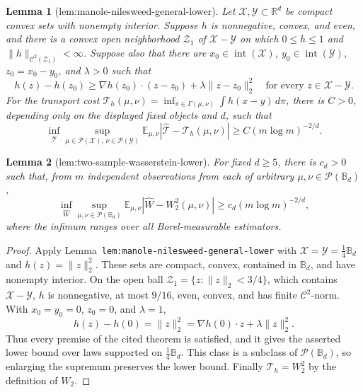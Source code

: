 \documentclass{article}
\newtheorem{lemma}{Lemma}
\begin{document}
\begin{lemma}[lem:manole-nilesweed-general-lower]\label{lem:manole-nilesweed-general-lower}
Let \(\mathcal X,\mathcal Y\subset\mathbb R^d\) be compact convex sets with nonempty interior. Suppose \(h\) is nonnegative, convex, and even, and there is a convex open neighborhood \(\mathcal Z_1\) of \(\mathcal X-\mathcal Y\) on which \(0\le h\le1\) and \(\|h\|_{\mathcal C^2(\mathcal Z_1)}<\infty\). Suppose also that there are \(x_0\in\operatorname{int}(\mathcal X)\), \(y_0\in\operatorname{int}(\mathcal Y)\), \(z_0=x_0-y_0\), and \(\lambda>0\) such that
\[
h(z)-h(z_0)\ge \nabla h(z_0)\mathbin\cdot(z-z_0)+\lambda\|z-z_0\|_2^2
\quad\text{for every }z\in\mathcal X-\mathcal Y.
\]
For the transport cost \(\mathcal T_h(\mu,\nu)=\inf_{\pi\in\Gamma(\mu,\nu)}\int h(x-y)\,d\pi\), there is \(C>0\), depending only on the displayed fixed objects and \(d\), such that
\[
\inf_{\widehat{\mathcal T}}\sup_{\mu\in\mathcal P(\mathcal X),\,\nu\in\mathcal P(\mathcal Y)}
\mathbb E_{\mu,\nu}|\widehat{\mathcal T}-\mathcal T_h(\mu,\nu)|
\ge C(m\log m)^{-2/d}.
\]
\end{lemma}

\begin{lemma}[lem:two-sample-wasserstein-lower]\label{lem:two-sample-wasserstein-lower}
For fixed \(d\ge5\), there is \(c_d>0\) such that, from \(m\) independent observations from each of arbitrary \(\mu,\nu\in\mathcal P(\mathbb B_d)\),
\[
\inf_{\widehat W}\sup_{\mu,\nu\in\mathcal P(\mathbb B_d)}
\mathbb E_{\mu,\nu}|\widehat W-W_2^2(\mu,\nu)|
\ge c_d(m\log m)^{-2/d},
\]
where the infimum ranges over all Borel-measurable estimators.
\end{lemma}
\begin{proof}
Apply Lemma~\texttt{lem:manole-nilesweed-general-lower} with \(\mathcal X=\mathcal Y=\tfrac14\mathbb B_d\) and \(h(z)=\|z\|_2^2\). These sets are compact, convex, contained in \(\mathbb B_d\), and have nonempty interior. On the open ball \(\mathcal Z_1=\{z:\|z\|_2<3/4\}\), which contains \(\mathcal X-\mathcal Y\), \(h\) is nonnegative, at most \(9/16\), even, convex, and has finite \(\mathcal C^2\)-norm. With \(x_0=y_0=0\), \(z_0=0\), and \(\lambda=1\),
\[
h(z)-h(0)=\|z\|_2^2=\nabla h(0)\mathbin\cdot z+\lambda\|z\|_2^2.
\]
Thus every premise of the cited theorem is satisfied, and it gives the asserted lower bound over laws supported on \(\tfrac14\mathbb B_d\). This class is a subclass of \(\mathcal P(\mathbb B_d)\), so enlarging the supremum preserves the lower bound. Finally \(\mathcal T_h=W_2^2\) by the definition of \(W_2\).
\end{proof}
\end{document}
